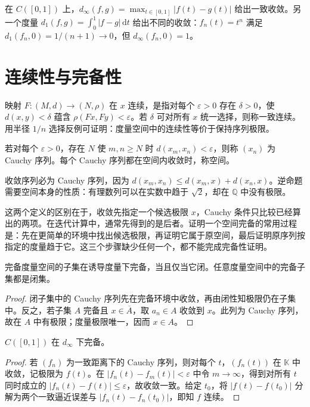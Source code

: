 \documentclass[UTF8,12pt,a4paper,fontset=fandol]{ctexbook}
\begin{document}
\begin{example}
在 $C([0,1])$ 上，$d_\infty(f,g)=\max_{t\in[0,1]}|f(t)-g(t)|$ 给出一致收敛。另一个度量 $d_1(f,g)=\int_0^1|f-g|\,\mathrm dt$ 给出不同的收敛：$f_n(t)=t^n$ 满足 $d_1(f_n,0)=1/(n+1)\to0$，但 $d_\infty(f_n,0)=1$。
\end{example}

\section{连续性与完备性}
映射 $F:(M,d)\to(N,\rho)$ 在 $x$ 连续，是指对每个 $\varepsilon>0$ 存在 $\delta>0$，使 $d(x,y)<\delta$ 蕴含 $\rho(Fx,Fy)<\varepsilon$。若 $\delta$ 可对所有 $x$ 统一选择，则称一致连续。用半径 $1/n$ 选择反例可证明：度量空间中的连续性等价于保持序列极限。

\begin{definition}
若对每个 $\varepsilon>0$，存在 $N$ 使 $m,n\geq N$ 时 $d(x_m,x_n)<\varepsilon$，则称 $(x_n)$ 为 Cauchy 序列。每个 Cauchy 序列都在空间内收敛时，称空间。
\end{definition}
收敛序列必为 Cauchy 序列，因为 $d(x_m,x_n)\leq d(x_m,x)+d(x_n,x)$。逆命题需要空间本身的性质：有理数列可以在实数中趋于 $\sqrt2$，却在 $\mathbb Q$ 中没有极限。

这两个定义的区别在于，收敛先指定一个候选极限 $x$，Cauchy 条件只比较已经算出的两项。在迭代计算中，通常先得到的是后者。证明一个空间完备的常用过程是：先在更简单的环境中找出候选极限，再证明它属于原空间，最后证明原序列按指定的度量趋于它。这三个步骤缺少任何一个，都不能完成完备性证明。

\begin{proposition}\label{prop:fa-closed-complete}
完备度量空间的子集在诱导度量下完备，当且仅当它闭。任意度量空间中的完备子集都是闭集。
\end{proposition}
\begin{proof}
闭子集中的 Cauchy 序列先在完备环境中收敛，再由闭性知极限仍在子集中。反之，若子集 $A$ 完备且 $x\in\overline A$，取 $a_n\in A$ 收敛到 $x$。此列为 Cauchy 序列，故在 $A$ 中有极限；度量极限唯一，因而 $x\in A$。
\end{proof}

\begin{example}[一致极限与完备性]
$C([0,1])$ 在 $d_\infty$ 下完备。
\end{example}
\begin{proof}
若 $(f_n)$ 为一致距离下的 Cauchy 序列，则对每个 $t$，$(f_n(t))$ 在 $\mathbb K$ 中收敛，记极限为 $f(t)$。在 $|f_n(t)-f_m(t)|<\varepsilon$ 中令 $m\to\infty$，得到对所有 $t$ 同时成立的 $|f_n(t)-f(t)|\leq\varepsilon$，故收敛一致。给定 $t_0$，将 $|f(t)-f(t_0)|$ 分解为两个一致逼近误差与 $|f_n(t)-f_n(t_0)|$，即知 $f$ 连续。
\end{proof}
\end{document}
